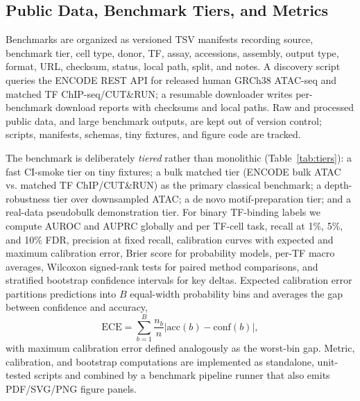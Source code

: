 \documentclass[biomedinformatics,article,submit,pdftex,moreauthors]{Definitions/mdpi}
\begin{document}
\subsection{Public Data, Benchmark Tiers, and Metrics}

Benchmarks are organized as versioned TSV manifests recording source, benchmark
tier, cell type, donor, TF, assay, accessions, assembly, output type, format,
URL, checksum, status, local path, split, and notes. A discovery script queries
the ENCODE REST API for released human GRCh38 ATAC-seq and matched TF
ChIP-seq/CUT\&RUN; a resumable downloader writes per-benchmark download reports
with checksums and local paths. Raw and processed public data, and large
benchmark outputs, are kept out of version control; scripts, manifests, schemas,
tiny fixtures, and figure code are tracked.

The benchmark is deliberately \emph{tiered} rather than monolithic
(Table~\ref{tab:tiers}): a fast CI-smoke tier on tiny fixtures; a bulk matched
tier (ENCODE bulk ATAC vs. matched TF ChIP/CUT\&RUN) as the primary classical
benchmark; a depth-robustness tier over downsampled ATAC; a de novo motif-preparation tier;
and a real-data pseudobulk demonstration tier. For binary TF-binding labels we compute AUROC and
AUPRC globally and per TF-cell task, recall at 1\%, 5\%, and 10\% FDR, precision at
fixed recall, calibration curves with expected and maximum calibration error,
Brier score for probability models, per-TF macro averages, Wilcoxon signed-rank
tests for paired method comparisons, and stratified bootstrap confidence intervals
for key deltas. Expected calibration error partitions predictions into $B$
equal-width probability bins and averages the gap between confidence and accuracy,
\[
\mathrm{ECE}=\sum_{b=1}^{B}\frac{n_b}{n}\left|\mathrm{acc}(b)-\mathrm{conf}(b)\right|,
\]
with maximum calibration error defined analogously as the worst-bin gap. Metric, calibration, and bootstrap computations are implemented as
standalone, unit-tested scripts and combined by a benchmark pipeline runner that
also emits PDF/SVG/PNG figure panels.
\end{document}
